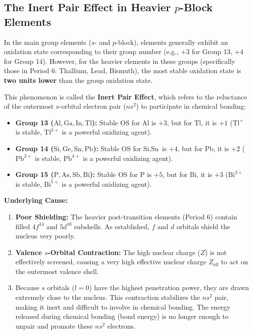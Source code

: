 \documentclass[12pt,a4paper]{article}
\begin{document}
\subsection{The Inert Pair Effect in Heavier \texorpdfstring{$p$}{p}-Block Elements}
In the main group elements ($s$- and $p$-block), elements generally exhibit an oxidation state corresponding to their group number (e.g., $+3$ for Group 13, $+4$ for Group 14). However, for the heavier elements in these groups (specifically those in Period 6: Thallium, Lead, Bismuth), the most stable oxidation state is \textbf{two units lower} than the group oxidation state.

This phenomenon is called the \textbf{Inert Pair Effect}, which refers to the reluctance of the outermost $s$-orbital electron pair ($ns^2$) to participate in chemical bonding:

\begin{tcolorbox}[defbox, title={Stable Oxidation States due to Inert Pair Effect}]
  \begin{itemize}[leftmargin=*, itemsep=4pt]
    \item \textbf{Group 13 ($\text{Al}, \text{Ga}, \text{In}, \text{Tl}$):} Stable OS for $\text{Al}$ is $+3$, but for $\text{Tl}$, it is $+1$ ($\text{Tl}^+$ is stable, $\text{Tl}^{3+}$ is a powerful oxidizing agent).
    \item \textbf{Group 14 ($\text{Si}, \text{Ge}, \text{Sn}, \text{Pb}$):} Stable OS for $\text{Si}, \text{Sn}$ is $+4$, but for $\text{Pb}$, it is $+2$ ($\text{Pb}^{2+}$ is stable, $\text{Pb}^{4+}$ is a powerful oxidizing agent).
    \item \textbf{Group 15 ($\text{P}, \text{As}, \text{Sb}, \text{Bi}$):} Stable OS for $\text{P}$ is $+5$, but for $\text{Bi}$, it is $+3$ ($\text{Bi}^{3+}$ is stable, $\text{Bi}^{5+}$ is a powerful oxidizing agent).
  \end{itemize}
\end{tcolorbox}

\textbf{Underlying Cause:}
\begin{enumerate}
  \item \textbf{Poor Shielding:} The heavier post-transition elements (Period 6) contain filled $4f^{14}$ and $5d^{10}$ subshells. As established, $f$ and $d$ orbitals shield the nucleus very poorly.
  \item \textbf{Valence $s$-Orbital Contraction:} The high nuclear charge ($Z$) is not effectively screened, causing a very high effective nuclear charge $Z_{\text{eff}}$ to act on the outermost valence shell.
  \item Because $s$ orbitals ($l=0$) have the highest penetration power, they are drawn extremely close to the nucleus. This contraction stabilizes the $ns^2$ pair, making it inert and difficult to involve in chemical bonding. The energy released during chemical bonding (bond energy) is no longer enough to unpair and promote these $ns^2$ electrons.
\end{enumerate}
\end{document}
